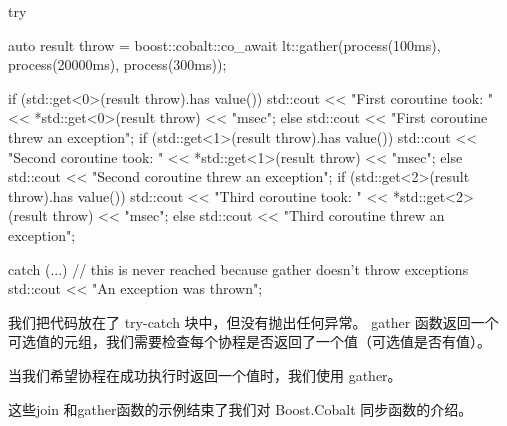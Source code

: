 \begin{cpp}
try{
    auto result throw =
    boost::cobalt::co_await lt::gather(process(100ms),
                                       process(20000ms),
                                       process(300ms));

    if (std::get<0>(result throw).has value()) {
        std::cout << "First coroutine took: "
                  << *std::get<0>(result throw)
                  << "msec\n";
    }
    else {
        std::cout << "First coroutine threw an exception\n";
    }
    if (std::get<1>(result throw).has value()) {
        std::cout << "Second coroutine took: "
                  << *std::get<1>(result throw)
                  << "msec\n";
    }
    else {
        std::cout << "Second coroutine threw an exception\n";
    }
    if (std::get<2>(result throw).has value()) {
        std::cout << "Third coroutine took: "
                  << *std::get<2>(result throw)
                  << "msec\n";
    }
    else {
        std::cout << "Third coroutine threw an exception\n";
    }
}
catch (...) {
    // this is never reached because gather doesn't throw exceptions
    std::cout << "An exception was thrown\n";
}
\end{cpp}

我们把代码放在了 try-catch 块中，但没有抛出任何异常。 gather 函数返回一个可选值的元组，我们需要检查每个协程是否返回了一个值（可选值是否有值）。

当我们希望协程在成功执行时返回一个值时，我们使用 gather。

这些join 和gather函数的示例结束了我们对 Boost.Cobalt 同步函数的介绍。






















